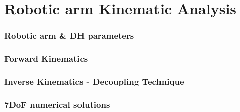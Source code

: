\section{Robotic arm Kinematic Analysis}

\begin{frame}
\frametitle{Robotic arm \& DH parameters}
\end{frame}

\begin{frame}
\frametitle{Forward Kinematics}
\end{frame}

\begin{frame}
\frametitle{Inverse Kinematics - Decoupling Technique}
\end{frame}

\begin{frame}
\frametitle{7DoF numerical solutions}
\end{frame}
